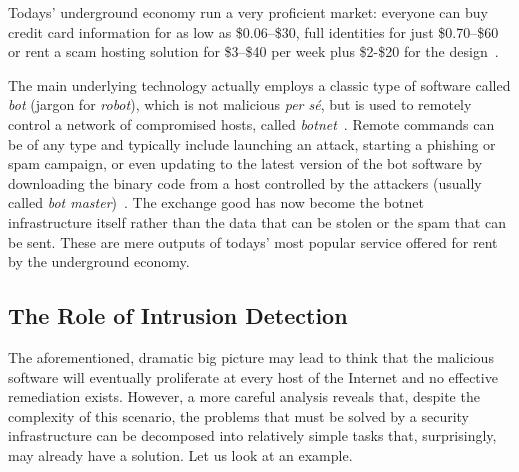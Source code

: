 Todays' underground economy run a very proficient market: everyone can buy credit card information for as low as \$0.06--\$30, full identities for just \$0.70--\$60 or rent a scam hosting solution for \$3--\$40 per week plus \$2-\$20 for the design~\citep{symantec_threat_report_2009}.

The main underlying technology actually employs a classic type of software called \emph{bot} (jargon for \emph{robot}), which is not malicious \emph{per s\'e}, but is used to remotely control a network of compromised hosts, called \emph{botnet}~\citep{holz}. Remote commands can be of any type and typically include launching an attack, starting a phishing or spam campaign, or even updating to the latest version of the bot software by downloading the binary code from a host controlled by the attackers (usually called \emph{bot master})~\citep{torpig}. The exchange good has now become the botnet infrastructure itself rather than the data that can be stolen or the spam that can be sent. These are mere outputs of todays' most popular service offered for rent by the underground economy.

\subsection{The Role of Intrusion Detection}
\label{introduction:motivation:ids-role}
The aforementioned, dramatic big picture may lead to think that the malicious software will eventually proliferate at every host of the Internet and no effective remediation exists. However, a more careful analysis reveals that, despite the complexity of this scenario, the problems that must be solved by a security infrastructure can be decomposed into relatively simple tasks that, surprisingly, may already have a solution. Let us look at an example.

